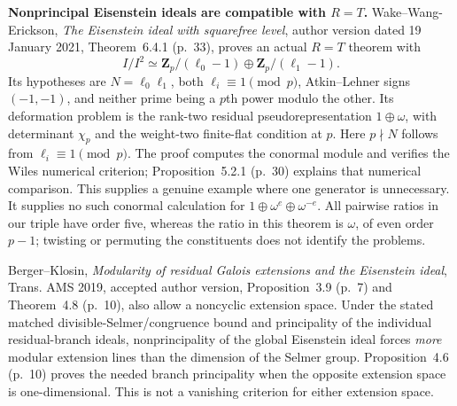 \documentclass[11pt,a4paper]{article}
\theoremstyle{definition}
\renewcommand{\paragraph}[1]{\par\smallskip\noindent\textbf{#1}\quad\ignorespaces}
\begin{document}
\paragraph{Nonprincipal Eisenstein ideals are compatible with $R=T$.}
Wake--Wang-Erickson, \emph{The Eisenstein ideal with squarefree
level}, author version dated 19 January 2021,
Theorem~6.4.1 (p.~33), proves an actual $R=T$ theorem with
\[
 I/I^2\simeq
 \mathbf Z_p/(\ell_0-1)\oplus\mathbf Z_p/(\ell_1-1).            \tag{D2.6}
\]
Its hypotheses are $N=\ell_0\ell_1$, both
$\ell_i\equiv1\pmod p$, Atkin--Lehner signs $(-1,-1)$, and
neither prime being a $p$th power modulo the other.  Its
deformation problem is the rank-two residual
pseudorepresentation $1\oplus\omega$, with determinant
$\chi_p$ and the weight-two finite-flat condition at $p$.
Here $p\nmid N$ follows from $\ell_i\equiv1\pmod p$.
The proof computes the conormal module and verifies the
Wiles numerical criterion; Proposition~5.2.1 (p.~30) explains
that numerical comparison.  This supplies a genuine example
where one generator is unnecessary.  It supplies no such
conormal calculation for $1\oplus\omega^e\oplus\omega^{-e}$.
All pairwise ratios in our triple have order five, whereas the
ratio in this theorem is $\omega$, of even order $p-1$; twisting
or permuting the constituents does not identify the problems.

Berger--Klosin, \emph{Modularity of residual Galois extensions
and the Eisenstein ideal}, Trans. AMS 2019, accepted author
version, Proposition~3.9 (p.~7) and Theorem~4.8 (p.~10), also
allow a noncyclic extension space.  Under the stated matched
divisible-Selmer/congruence bound and principality of the
individual residual-branch ideals, nonprincipality of the
global Eisenstein ideal forces \emph{more} modular extension
lines than the dimension of the Selmer group.
Proposition~4.6 (p.~10) proves the needed branch principality
when the opposite extension space is one-dimensional.
This is not a vanishing criterion for either extension space.
\end{document}
